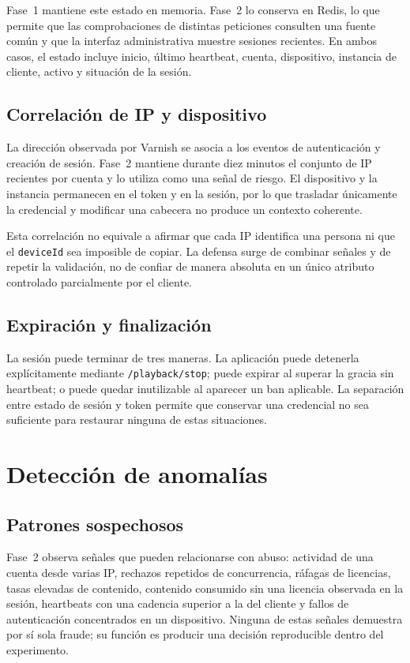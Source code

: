 Fase~1 mantiene este estado en memoria. Fase~2 lo conserva en Redis, lo que permite que las comprobaciones de distintas peticiones consulten una fuente común y que la interfaz administrativa muestre sesiones recientes. En ambos casos, el estado incluye inicio, último heartbeat, cuenta, dispositivo, instancia de cliente, activo y situación de la sesión.

\subsection{Correlación de IP y dispositivo}

La dirección observada por Varnish se asocia a los eventos de autenticación y creación de sesión. Fase~2 mantiene durante diez minutos el conjunto de IP recientes por cuenta y lo utiliza como una señal de riesgo. El dispositivo y la instancia permanecen en el token y en la sesión, por lo que trasladar únicamente la credencial y modificar una cabecera no produce un contexto coherente.

Esta correlación no equivale a afirmar que cada IP identifica una persona ni que el \nolinkurl{deviceId} sea imposible de copiar. La defensa surge de combinar señales y de repetir la validación, no de confiar de manera absoluta en un único atributo controlado parcialmente por el cliente.

\subsection{Expiración y finalización}

La sesión puede terminar de tres maneras. La aplicación puede detenerla explícitamente mediante \nolinkurl{/playback/stop}; puede expirar al superar la gracia sin heartbeat; o puede quedar inutilizable al aparecer un ban aplicable. La separación entre estado de sesión y token permite que conservar una credencial no sea suficiente para restaurar ninguna de estas situaciones.

\section{Detección de anomalías}

\subsection{Patrones sospechosos}

Fase~2 observa señales que pueden relacionarse con abuso: actividad de una cuenta desde varias IP, rechazos repetidos de concurrencia, ráfagas de licencias, tasas elevadas de contenido, contenido consumido sin una licencia observada en la sesión, heartbeats con una cadencia superior a la del cliente y fallos de autenticación concentrados en un dispositivo. Ninguna de estas señales demuestra por sí sola fraude; su función es producir una decisión reproducible dentro del experimento.

